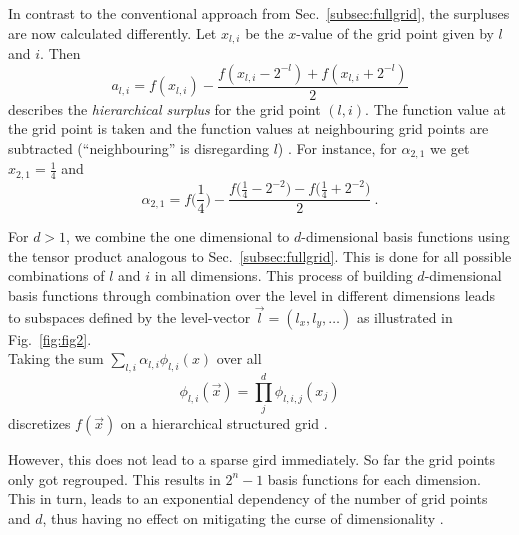 In contrast to the conventional approach from
Sec.~\ref{subsec:fullgrid}, the surpluses are now calculated
differently.
Let $x_{l,i}$ be the $x$-value of the grid point given by $l$ and $i$. Then
$$a_{l,i} = f(x_{l,i}) - \frac{f(x_{l,i} - 2^{-l}) + f(x_{l,i} + 2^{-l})}{2}$$
describes the \emph{hierarchical surplus} for the grid point $(l,i)$. The function
value at the grid point is taken and the function values
at neighbouring grid points are subtracted (``neighbouring''
is disregarding $l$) \cite{artbunlong}.
For instance, for $\alpha_{2,1}$ we get $x_{2,1} =
\frac{1}{4}$ and
$$\alpha_{2,1} = f\Big(\frac{1}{4}\Big) - \frac{f\Big(\frac{1}{4} - 2^{-2}\Big) - f\Big(\frac{1}{4} + 2^{-2}\Big)}{2} \ .$$
\par
For $d > 1$, we combine the one dimensional
to $d$-dimensional basis functions using the tensor product
analogous to Sec.~\ref{subsec:fullgrid}. This is done for all possible combinations
of $l$ and $i$ in all dimensions.
This process of building $d$-dimensional basis functions
through combination over the level in different dimensions leads to
subspaces defined by the level-vector $\vec{l} = (l_x, l_y, \dots)$
as illustrated in Fig.~\ref{fig:fig2}. \\
Taking the sum $\sum_{l,i} \alpha_{l,i}\phi_{l,i}(x)$ over all
$$\phi_{l,i}(\vec{x}) = \prod_j^d{\phi_{l,i,j}(x_j)}$$
discretizes $f(\vec{x})$ on a hierarchical structured grid \cite{disspfl}.
\par
However, this does not lead to a sparse gird immediately. So far the
grid points only got regrouped. This
results in $2^{n} - 1$ basis functions for each dimension.
This in turn, leads to an exponential dependency of the number of grid points
and $d$, thus having no effect on mitigating the curse of dimensionality
\cite{disspfl}.




